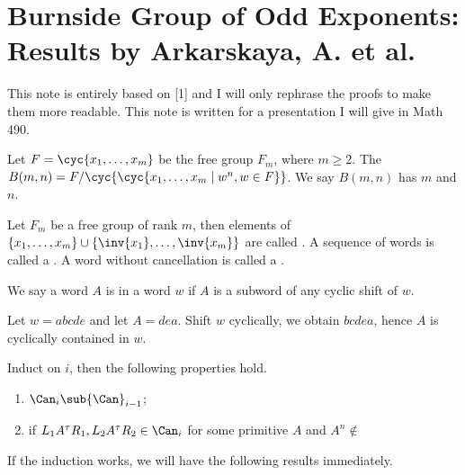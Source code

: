 \section{Burnside Group of Odd Exponents: Results by Arkarskaya, A. et al.}
\par
This note is entirely based on [1] and I will only rephrase the proofs to make them more readable. This note is written for a presentation I will give in Math 490.
\begin{definition}
    Let $F=\cyc{{x}_{1},\dots,{x}_{m}}$ be the free group ${F}_{m}$, where $m\ge 2$. The  $B(m,n)=F/\cyc{\cyc{{x}_{1},\dots,{x}_{m}\mid{w}^{n},w\in F}}$. We say $B(m,n)$ has  $m$ and  $n$.
\end{definition}
\begin{definition}
    Let ${F}_{m}$ be a free group of rank $m$, then elements of $\{{x}_{1},\dots,{x}_{m}\}\cup\{\inv{{x}_{1}},\dots,\inv{{x}_{m}}\}$ are called . A sequence of words is called a . A word without cancellation is called a .
\end{definition}
\begin{definition}
    We say a word $A$ is  in a word $w$ if $A$ is a subword of any cyclic shift of $w$.
\end{definition}
\begin{example}
    Let $w=abcde$ and let $A=dea$. Shift $w$ cyclically, we obtain $bcdea$, hence $A$ is cyclically contained in $w$.
\end{example}

\newpage


\begin{theorem}
    Induct on $i$, then the following properties hold.
    \begin{enumerate}
        \item ${\Can}_{i}\sub{\Can}_{i-1}$;
        \item if ${L}_{1}{A}^{\tau}{R}_{1},{L}_{2}{A}^{\tau}{R}_{2}\in{\Can}_{i}$ for some primitive $A$ and ${A}^{n}\notin$
    \end{enumerate}
\end{theorem}




\par
If the induction works, we will have the following results immediately.
\begin{theorem}
    
\end{theorem}